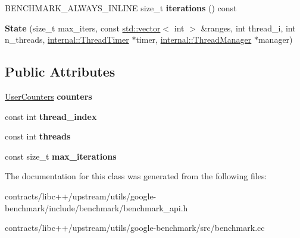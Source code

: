 \begin{DoxyCompactItemize}
B\+E\+N\+C\+H\+M\+A\+R\+K\+\_\+\+A\+L\+W\+A\+Y\+S\+\_\+\+I\+N\+L\+I\+NE size\+\_\+t {\bfseries iterations} () const
\item 
\mbox{\label{classbenchmark_1_1_state_ac1ad0344afc23e1c017e0ef253186210}} 
{\bfseries State} (size\+\_\+t max\+\_\+iters, const \mbox{\hyperlink{classstd_1_1vector}{std\+::vector}}$<$ int $>$ \&ranges, int thread\+\_\+i, int n\+\_\+threads, \mbox{\hyperlink{classbenchmark_1_1internal_1_1_thread_timer}{internal\+::\+Thread\+Timer}} $\ast$timer, \mbox{\hyperlink{classbenchmark_1_1internal_1_1_thread_manager}{internal\+::\+Thread\+Manager}} $\ast$manager)
\end{DoxyCompactItemize}
\subsection*{Public Attributes}
\begin{DoxyCompactItemize}
\item 
\mbox{\label{classbenchmark_1_1_state_adf231aa663aaba3ac587a75e6f7c7459}} 
\mbox{\hyperlink{classstd_1_1map}{User\+Counters}} {\bfseries counters}
\item 
\mbox{\label{classbenchmark_1_1_state_adff02463139b6782b038eaa6515fd7de}} 
const int {\bfseries thread\+\_\+index}
\item 
\mbox{\label{classbenchmark_1_1_state_ad970c206537855f57285c63763e90bc5}} 
const int {\bfseries threads}
\item 
\mbox{\label{classbenchmark_1_1_state_a68d3a9324fafbe40ac6d99c0538b8783}} 
const size\+\_\+t {\bfseries max\+\_\+iterations}
\end{DoxyCompactItemize}


The documentation for this class was generated from the following files\+:\begin{DoxyCompactItemize}
\item 
contracts/libc++/upstream/utils/google-\/benchmark/include/benchmark/benchmark\+\_\+api.\+h\item 
contracts/libc++/upstream/utils/google-\/benchmark/src/benchmark.\+cc\end{DoxyCompactItemize}
